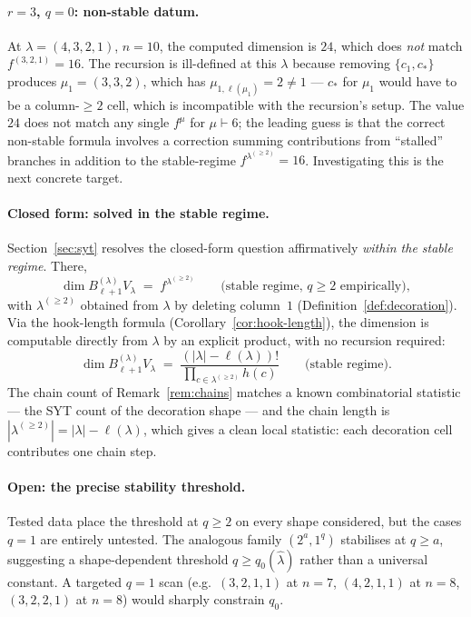 \documentclass[11pt]{article}
\theoremstyle{definition}
\begin{document}
\paragraph{$r = 3$, $q = 0$: non-stable datum.}
At $\lambda = (4, 3, 2, 1)$, $n = 10$, the computed dimension is $24$,
which does \emph{not} match $f^{(3, 2, 1)} = 16$. The recursion is
ill-defined at this $\lambda$ because removing $\{c_1, c_*\}$ produces
$\mu_1 = (3, 3, 2)$, which has $\mu_{1, \ell(\mu_1)} = 2 \ne 1$ ---
$c_*$ for $\mu_1$ would have to be a column-$\ge 2$ cell, which is
incompatible with the recursion's setup. The value $24$ does not match
any single $f^\mu$ for $\mu \vdash 6$; the leading guess is that the
correct non-stable formula involves a correction summing contributions
from ``stalled'' branches in addition to the stable-regime
$f^{\lambda^{(\ge 2)}} = 16$. Investigating this is the next concrete
target.

\paragraph{Closed form: solved in the stable regime.}
Section~\ref{sec:syt} resolves the closed-form question affirmatively
\emph{within the stable regime}. There,
\[
   \dim B_{\ell + 1}^{(\lambda)} V_\lambda \;=\; f^{\lambda^{(\ge 2)}}
   \qquad\text{(stable regime, $q \ge 2$ empirically)},
\]
with $\lambda^{(\ge 2)}$ obtained from $\lambda$ by deleting column~$1$
(Definition~\ref{def:decoration}). Via the hook-length formula
(Corollary~\ref{cor:hook-length}), the dimension is computable directly
from $\lambda$ by an explicit product, with no recursion required:
\[
   \dim B_{\ell + 1}^{(\lambda)} V_\lambda
   \;=\;
   \frac{(|\lambda| - \ell(\lambda))!}{\displaystyle\prod_{c \in \lambda^{(\ge 2)}} h(c)}
   \qquad\text{(stable regime)}.
\]
The chain count of Remark~\ref{rem:chains} matches a known
combinatorial statistic --- the SYT count of the decoration shape ---
and the chain length is $|\lambda^{(\ge 2)}| = |\lambda| - \ell(\lambda)$,
which gives a clean local statistic: each decoration cell contributes
one chain step.

\paragraph{Open: the precise stability threshold.}
Tested data place the threshold at $q \ge 2$ on every shape considered,
but the cases $q = 1$ are entirely untested. The analogous family
$(2^a, 1^q)$ stabilises at $q \ge a$, suggesting a shape-dependent
threshold $q \ge q_0(\widehat\lambda)$ rather than a universal constant.
A targeted $q = 1$ scan (e.g.\ $(3, 2, 1, 1)$ at $n = 7$,
$(4, 2, 1, 1)$ at $n = 8$, $(3, 2, 2, 1)$ at $n = 8$) would sharply
constrain $q_0$.
\end{document}
